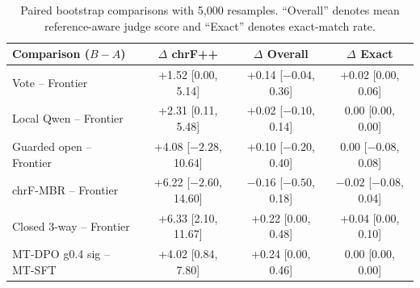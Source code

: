 \begin{table}[t]
\centering
\small
\begin{tabular}{lccc}
\toprule
Comparison ($B-A$) & $\Delta$ chrF++ & $\Delta$ Overall & $\Delta$ Exact \\
\midrule
Vote -- Frontier & +1.52 [0.00, 5.14] & +0.14 [$-0.04$, 0.36] & +0.02 [0.00, 0.06] \\
Local Qwen -- Frontier & +2.31 [0.11, 5.48] & +0.02 [$-0.10$, 0.14] & 0.00 [0.00, 0.00] \\
Guarded open -- Frontier & +4.08 [$-2.28$, 10.64] & +0.10 [$-0.20$, 0.40] & 0.00 [$-0.08$, 0.08] \\
chrF-MBR -- Frontier & +6.22 [$-2.60$, 14.60] & $-0.16$ [$-0.50$, 0.18] & $-0.02$ [$-0.08$, 0.04] \\
Closed 3-way -- Frontier & +6.33 [2.10, 11.67] & +0.22 [0.00, 0.48] & +0.04 [0.00, 0.10] \\
MT-DPO g0.4 sig -- MT-SFT & +4.02 [0.84, 7.80] & +0.24 [0.00, 0.46] & 0.00 [0.00, 0.00] \\
\bottomrule
\end{tabular}
\caption{Paired bootstrap comparisons with 5,000 resamples. ``Overall'' denotes mean reference-aware judge score and ``Exact'' denotes exact-match rate.}
\label{tab:statistical-robustness}
\end{table}
